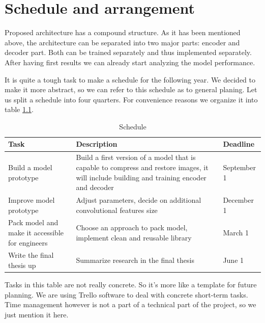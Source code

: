 \chapter{Schedule and arrangement}

Proposed architecture has a compound structure. As it has been mentioned above, the architecture can be separated into two major parts: encoder and decoder part. Both can be trained separately and thus implemented separately. After having first results we can already start analyzing the model performance.

It is quite a tough task to make a schedule for the following year. We decided to make it more abstract, so we can refer to this schedule as to general planing. Let us split a schedule into four quarters. For convenience reasons we organize it into table \ref{tab:schedule}.

\begin{table}
    \centering
    \caption{Schedule}
    \label{tab:schedule}
    \begin{tabular}{p{4cm}|p{8cm}|p{2cm}}
        \hline
        Task & Description & Deadline \\
        \hline
        Build a model prototype & Build a first version of a model that is capable to compress and restore images, it will include building and training encoder and decoder & September 1 \\
        \hline
        Improve model prototype & Adjust parameters, decide on additional convolutional features size & December 1 \\
        \hline
        Pack model and make it accessible for engineers & Choose an approach to pack model, implement clean and reusable library & March 1 \\
        \hline
        Write the final thesis up & Summarize research in the final thesis & June 1 \\
        \hline
    \end{tabular}
\end{table}

Tasks in this table are not really concrete. So it's more like a template for future planning. We are using Trello software to deal with concrete short-term tasks. Time management however is not a part of a technical part of the project, so we just mention it here.